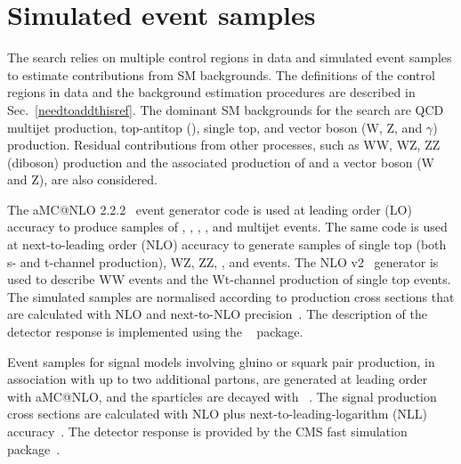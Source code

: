 \section{Simulated event samples}
\label{sec:simulation}


The search relies on multiple control regions in data and simulated
event samples to estimate contributions from SM backgrounds. The
definitions of the control regions in data and the background
estimation procedures are described in
Sec.~\ref{needtoaddthisref}. The dominant SM backgrounds for the
search are QCD multijet production, top-antitop (\ttbar), single top,
and vector boson (W, Z, and $\gamma$) production. Residual
contributions from other processes, such as WW, WZ, ZZ (diboson)
production and the associated production of \ttbar and a vector boson
(W and Z), are also considered.

The  aMC@NLO 2.2.2~\cite{Alwall2014} event generator code is
used at leading order (LO) accuracy to produce samples of \wj, \zj,
\gj, \ttbar, and multijet events. The same code is used at
next-to-leading order (NLO) accuracy to generate samples of single top
(both s- and t-channel production), WZ, ZZ, \ttw, and \ttz events. The
NLO \POWHEG v2~\cite{powheg, powheg_top_Wt} generator is used to
describe WW events and the Wt-channel production of single top
events. The simulated samples are normalised according to production
cross sections that are calculated with NLO and next-to-NLO
precision~\cite{Alwall2014, wphys, fewz, wwxs, top++, nlotop,
  powheg_top_Wt}. The description of the detector response is
implemented using the \GEANTfour~\cite{geant} package.

Event samples for signal models involving gluino or squark pair
production, in association with up to two additional partons, are
generated at leading order with  aMC@NLO, and the sparticles
are decayed with ~\cite{pythia}. The signal production cross
sections are calculated with NLO plus next-to-leading-logarithm (NLL)
accuracy~\cite{Beenakker:1996ch, PhysRevLett.102.111802,
  PhysRevD.80.095004, 1126-6708-2009-12-041,
  doi:10.1142/S0217751X11053560, susynlo}. The detector response is
provided by the CMS fast simulation package~\cite{fastsim}. 


